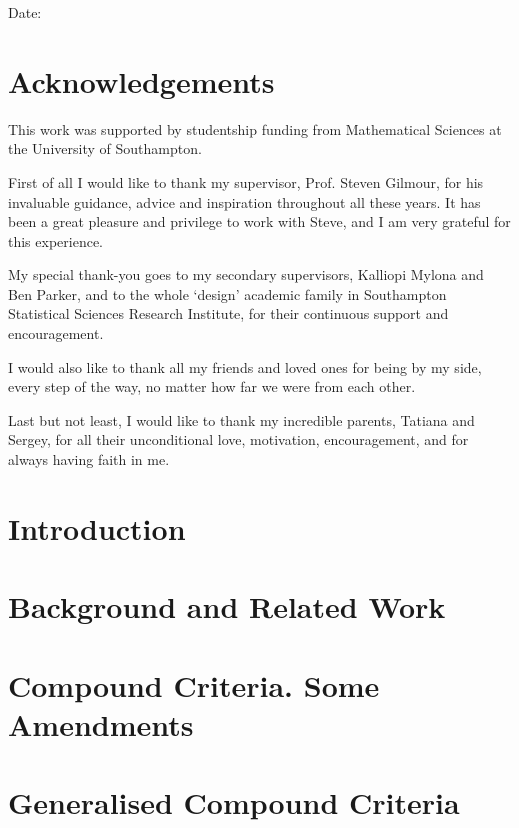 \documentclass[titlepage,twoside,openright,final,11pt]{report}
\newcommand\blankpage{%
    \null
    \thispagestyle{empty}%
    \addtocounter{page}{-1}%
    \newpage}
\begin{document}
Date:

\chapter*{Acknowledgements}


This work was supported by studentship funding from Mathematical Sciences at the University of Southampton.

First of all I would like to thank my supervisor, Prof. Steven Gilmour, for his invaluable guidance, advice and inspiration throughout all these years. It has been a great pleasure and privilege to work with Steve, and I am very grateful for this experience.

My special thank-you goes to my secondary supervisors, Kalliopi Mylona and Ben Parker, and to the whole `design' academic family in Southampton Statistical Sciences Research Institute, for their continuous support and encouragement. 

I would also like to thank all my friends and loved ones for being by my side, every step of the way, no matter how far we were from each other.

Last but not least, I would like to thank my incredible parents, Tatiana and Sergey, for all their unconditional love, motivation, encouragement, and for always having faith in me.


\setcounter{chapter}{0}
\chapter{Introduction}


\chapter{Background and Related Work}
\label{ch::background}


\chapter{Compound Criteria. Some Amendments}
\label{ch::compound}


\chapter{Generalised Compound Criteria}
\label{ch::generalised}

\end{document}
